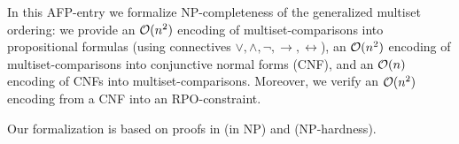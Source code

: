 \documentclass[11pt,a4paper]{article}
\begin{document}
In this AFP-entry we formalize NP-completeness of the generalized multiset ordering: 
we provide an ${\cal O}(n^2)$ encoding of multiset-comparisons into propositional formulas (using connectives
${\vee},{\wedge},{\neg},{\rightarrow},{\leftrightarrow}$), 
an ${\cal O}(n^2)$ encoding of multiset-comparisons into conjunctive normal forms (CNF),
and an ${\cal O}(n)$ encoding of CNFs into multiset-comparisons.
Moreover, we verify an ${\cal O}(n^2)$ encoding from a CNF into an RPO-constraint.

Our formalization is based on proofs in \cite{RPO_NP} (in NP) and \cite{RPO_NPC} (NP-hardness).







\end{document}
